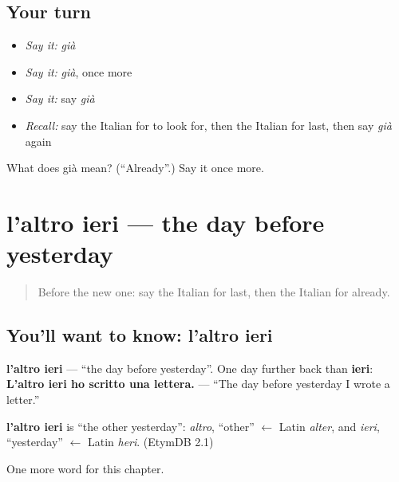\subsection*{Your turn}
\begin{itemize}
\raggedright
  \item \emph{Say it:} \emph{già}
  \item \emph{Say it:} \emph{già}, once more
  \item \emph{Say it:} say \emph{già}
  \item \emph{Recall:} say the Italian for to look for, then the Italian for last, then say \emph{già} again
\end{itemize}

\begin{tcolorbox}[breakable,colback=teal!4,colframe=teal!35!black,title={Before you move on}]
What does già mean? (\textquotedblleft{}Already\textquotedblright{}.) Say it once more.
\end{tcolorbox}
\section[l'altro ieri]{l'altro ieri — the day before yesterday}

\label{lesson:IT-C137-laltro-ieri}



\begin{quote}
Before the new one: say the Italian for last, then the Italian for already.
\end{quote}

\subsection*{You'll want to know: l'altro ieri}
\textbf{l'altro ieri} — \textquotedblleft{}the day before yesterday\textquotedblright{}. One day further back than \textbf{ieri}: \textbf{L'altro ieri ho scritto una lettera.} — \textquotedblleft{}The day before yesterday I wrote a letter.\textquotedblright{}

\begin{cousinweb}
\textbf{l'altro ieri} is \textquotedblleft{}the other yesterday\textquotedblright{}: \emph{altro}, \textquotedblleft{}other\textquotedblright{} $\leftarrow$ Latin \emph{alter}, and \emph{ieri}, \textquotedblleft{}yesterday\textquotedblright{} $\leftarrow$ Latin \emph{heri}. (EtymDB 2.1)
\end{cousinweb}

\begin{grammarlens}[title={What you've built}]
One more word for this chapter.
\end{grammarlens}

